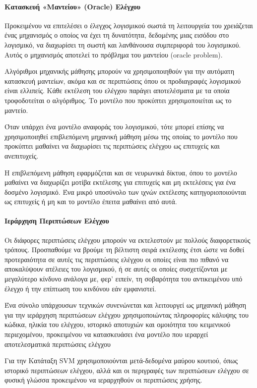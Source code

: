 \documentclass[12pt]{article}
\begin{document}
\paragraph{Κατασκευή «Μαντείου» (Oracle) Ελέγχου}
Προκειμένου να επιτελέσει ο έλεγχος λογισμικού σωστά τη λειτουργεία του χρειάζεται ένας μηχανισμός ο οποίος να έχει τη δυνατότητα, δεδομένης μιας εισόδου στο λογισμικό, να διαχωρίσει τη σωστή και λανθάνουσα συμπεριφορά του λογισμικού. Αυτός ο μηχανισμός αποτελεί το πρόβλημα του μαντείου (oracle problem).
\par Αλγόριθμοι μηχανικής μάθησης μπορούν να χρησιμοποιηθούν για την αυτόματη κατασκευή μαντείων, ακόμα και σε περιπτώσεις όπου οι προδιαγραφές λογισμικού είναι ελλιπείς. Κάθε εκτέλεση του ελέγχου παράγει αποτελέσματα με τα οποία τροφοδοτείται ο αλγόριθμος. Το μοντέλο που προκύπτει χρησιμοποιείται ως το μαντείο.
\par Όταν υπάρχει ένα μοντέλο αναφοράς του λογισμικού, τότε μπορεί επίσης να χρησιμοποιηθεί επιβλεπόμενη μηχανική μάθηση μέσω της οποίας το μοντέλο που προκύπτει μαθαίνει να διαχωρίσει τις περιπτώσεις ελέγχου ως επιτυχείς και ανεπιτυχείς.
\par Η επιβλεπόμενη μάθηση εφαρμόζεται και σε νευρωνικά δίκτυα, όπου το μοντέλο μαθαίνει να διαχωρίζει μοτίβα εκτέλεσης για επιτυχείς και μη εκτελέσεις για ένα δοσμένο λογισμικό. Ένα μικρό υποσύνολο των ιχνών εκτέλεσης κατηγοριοποιούνται ως επιτυχείς ή μη και το μοντέλο έπειτα μαθαίνει από αυτά.

\paragraph{Ιεράρχηση Περιπτώσεων Ελέγχου}
Οι διάφορες περιπτώσεις ελέγχου μπορούν να εκτελεστούν με πολλούς διαφορετικούς τρόπους. Προσπαθούμε να βρούμε τη βέλτιστη σειρά εκτέλεσης έτσι ώστε να δοθεί προτεραιότητα σε αυτές τις περιπτώσεις ελέγχου οι οποίες είναι πιο πιθανό να αποκαλύψουν ατέλειες του λογισμικού, ή σε αυτές οι οποίες συσχετίζονται με μεγαλύτερο κίνδυνο ανάλογα με, φερ’ ειπείν, τη σοβαρότητα του αντικειμένου υπό έλεγχο ή την επίπτωση του κινδύνου εάν εμφανιστεί.
\par Ένα σύνολο υπάρχουσων τεχνικών συνενώνεται και λειτουργεί ως μηχανική μάθηση για την ιεράρχηση περιπτώσεων ελέγχου χρησιμοποιώντας πληροφορίες κάλυψης του κώδικα, ηλικία του ελέγχου, ιστορικό αποτυχιών και ομοιότητα του κειμενικού περιεχομένου, προκειμένου να κατασκευάσει ένα μοντέλο που ιεραρχεί αποτελεσματικά περιπτώσεις ελέγχου
\par Για την Κατάταξη SVM χρησιμοποιούνται μετά-δεδομένα μαύρου κουτιού, όπως ιστορικό περιπτώσεων ελέγχου, αλλά και οι περιγραφές των περιπτώσεων ελέγχου σε φυσική γλώσσα προκειμένου να ιεραρχηθούν οι περιπτώσεις χρήσης.
\end{document}
